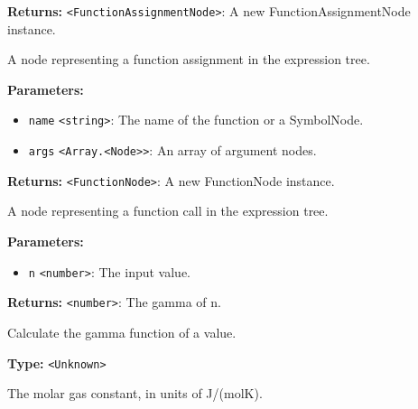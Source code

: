 \documentclass[12pt,a4paper]{article}
\begin{document}
\noindent \textbf{Returns:} \texttt{<FunctionAssignmentNode>}: A new FunctionAssignmentNode instance.

\noindent A node representing a function assignment in the expression tree.

\vspace{5mm}
\noindent {}


\noindent \textbf{Parameters:}
\begin{itemize}
  \item \texttt{name} \texttt{<string>}: The name of the function or a SymbolNode.
  \item \texttt{args} \texttt{<Array.<Node>>}: An array of argument nodes.
\end{itemize}

\noindent \textbf{Returns:} \texttt{<FunctionNode>}: A new FunctionNode instance.

\noindent A node representing a function call in the expression tree.

\vspace{5mm}
\noindent {}


\noindent \textbf{Parameters:}
\begin{itemize}
  \item \texttt{n} \texttt{<number>}: The input value.
\end{itemize}

\noindent \textbf{Returns:} \texttt{<number>}: The gamma of n.

\noindent Calculate the gamma function of a value.

\vspace{5mm}
\noindent {}\vspace{4mm}


\noindent \textbf{Type:} \texttt{<Unknown>}

\noindent The molar gas constant, in units of J/(molK).

\vspace{5mm}
\noindent {}
\end{document}
